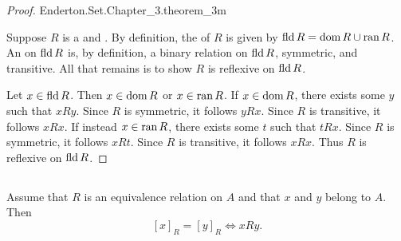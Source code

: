 \documentclass{report}
\begin{document}
\begin{proof}

    {Enderton.Set.Chapter\_3.theorem\_3m}

  Suppose $R$ is a  and 
    .
  By definition, the  of $R$ is given by
    $\mathop{\text{fld}}{R} = \mathop{\text{dom}}{R} \cup \mathop{\text{ran}}{R}$.
  An  on $\mathop{\text{fld}}{R}$ is, by definition, a
    binary relation  on $\mathop{\text{fld}}{R}$, symmetric, and
    transitive.
  All that remains is to show $R$ is reflexive on $\mathop{\text{fld}}{R}$.

  Let $x \in \mathop{\text{fld}}{R}$.
  Then $x \in \mathop{\text{dom}}{R}$ or $x \in \mathop{\text{ran}}{R}$.
  If $x \in \mathop{\text{dom}}{R}$, there exists some $y$ such that $xRy$.
  Since $R$ is symmetric, it follows $yRx$.
  Since $R$ is transitive, it follows $xRx$.
  If instead $x \in \mathop{\text{ran}}{R}$, there exists some $t$ such that $tRx$.
  Since $R$ is symmetric, it follows $xRt$.
  Since $R$ is transitive, it follows $xRx$.
  Thus $R$ is reflexive on $\mathop{\text{fld}}{R}$.

\end{proof}

\subsection{}%

\begin{lemma}[3N]

  Assume that $R$ is an equivalence relation on $A$ and that $x$ and $y$ belong
    to $A$.
  Then $$[x]_R = [y]_R \iff xRy.$$

\end{lemma}
\end{document}
